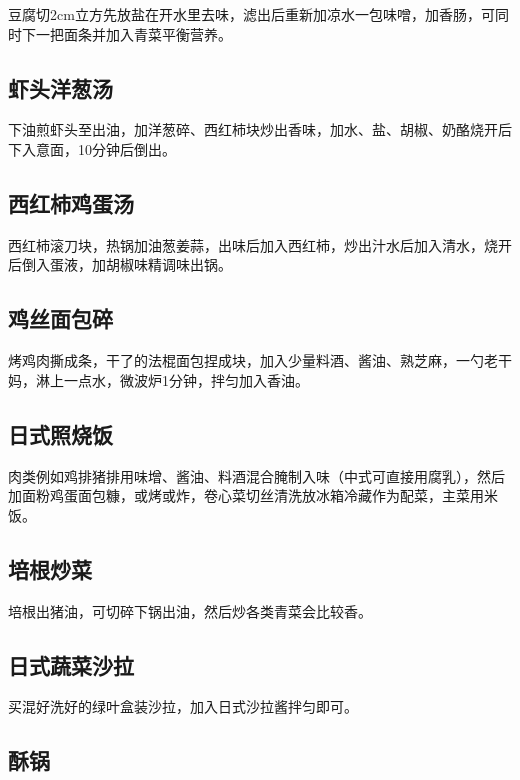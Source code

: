 \documentclass[
  letterpaper,
  DIV=11,
  numbers=noendperiod]{scrreprt}
\begin{document}
豆腐切2cm立方先放盐在开水里去味，滤出后重新加凉水一包味噌，加香肠，可同时下一把面条并加入青菜平衡营养。

\subsection{虾头洋葱汤}\label{ux867eux5934ux6d0bux8471ux6c64}

下油煎虾头至出油，加洋葱碎、西红柿块炒出香味，加水、盐、胡椒、奶酪烧开后下入意面，10分钟后倒出。

\subsection{西红柿鸡蛋汤}\label{ux897fux7ea2ux67ffux9e21ux86cbux6c64}

西红柿滚刀块，热锅加油葱姜蒜，出味后加入西红柿，炒出汁水后加入清水，烧开后倒入蛋液，加胡椒味精调味出锅。

\subsection{鸡丝面包碎}\label{ux9e21ux4e1dux9762ux5305ux788e}

烤鸡肉撕成条，干了的法棍面包捏成块，加入少量料酒、酱油、熟芝麻，一勺老干妈，淋上一点水，微波炉1分钟，拌匀加入香油。

\subsection{日式照烧饭}\label{ux65e5ux5f0fux7167ux70e7ux996d}

肉类例如鸡排猪排用味增、酱油、料酒混合腌制入味（中式可直接用腐乳），然后加面粉鸡蛋面包糠，或烤或炸，卷心菜切丝清洗放冰箱冷藏作为配菜，主菜用米饭。

\subsection{培根炒菜}\label{ux57f9ux6839ux7092ux83dc}

培根出猪油，可切碎下锅出油，然后炒各类青菜会比较香。

\subsection{日式蔬菜沙拉}\label{ux65e5ux5f0fux852cux83dcux6c99ux62c9}

买混好洗好的绿叶盒装沙拉，加入日式沙拉酱拌匀即可。

\subsection{酥锅}\label{ux9165ux9505}
\end{document}
